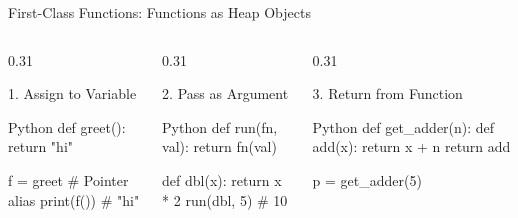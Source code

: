 \begin{frame}[fragile]{First-Class Functions: Functions as Heap Objects}
  \begin{columns}[T,onlytextwidth]
    \begin{column}{0.31\textwidth}
      \begin{ConceptBox}{1. Assign to Variable}
        \begin{CodeBlock}{Python}
def greet():
    return "hi"

f = greet # Pointer alias
print(f()) # "hi"
        \end{CodeBlock}
      \end{ConceptBox}
    \end{column}
    \begin{column}{0.31\textwidth}
      \begin{ConceptBox}{2. Pass as Argument}
        \begin{CodeBlock}{Python}
def run(fn, val):
    return fn(val)

def dbl(x):
    return x * 2
run(dbl, 5) # 10
        \end{CodeBlock}
      \end{ConceptBox}
    \end{column}
    \begin{column}{0.31\textwidth}
      \begin{ConceptBox}{3. Return from Function}
        \begin{CodeBlock}{Python}
def get_adder(n):
    def add(x):
        return x + n
    return add

p = get_adder(5)
        \end{CodeBlock}
      \end{ConceptBox}
    \end{column}
  \end{columns}
  \vspace{0.18cm}
\end{frame}

